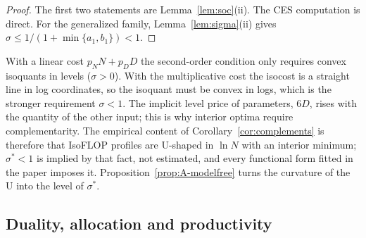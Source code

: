 \begin{proof}
The first two statements are Lemma~\ref{lem:soc}(ii). The CES computation is direct. For the generalized family,
Lemma~\ref{lem:sigma}(ii) gives $\sigma\le1/(1+\min\{a_1,b_1\})<1$.
\end{proof}

\begin{remark}
With a linear cost $p_NN+p_DD$ the second-order condition only requires convex isoquants in levels ($\sigma>0$). With the
multiplicative cost the isocost is a straight line in log coordinates, so the isoquant must be convex in logs, which is
the stronger requirement $\sigma<1$. The implicit level price of parameters, $6D$, rises with the quantity of the other
input; this is why interior optima require complementarity. The empirical content of Corollary~\ref{cor:complements} is
therefore that IsoFLOP profiles are U-shaped in $\ln N$ with an interior minimum; $\sigma^*<1$ is implied by that fact,
not estimated, and every functional form fitted in the paper imposes it. Proposition~\ref{prop:A-modelfree} turns the
curvature of the U into the level of $\sigma^*$.
\end{remark}

\subsection{Duality, allocation and productivity}\label{app:duality}

